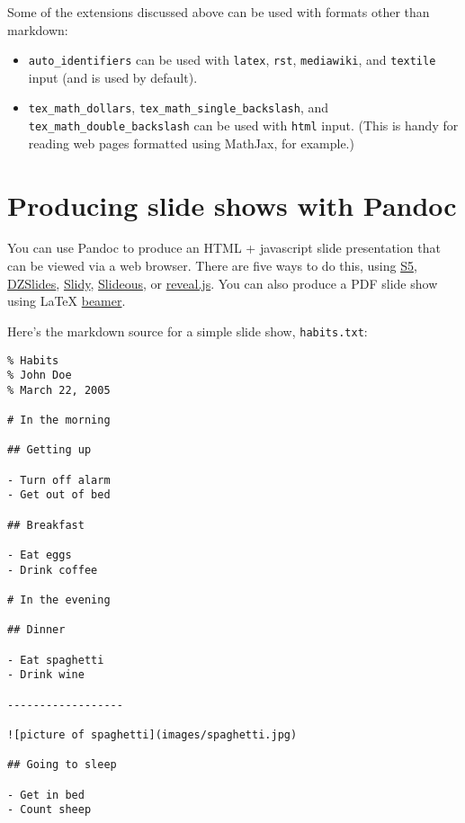 \documentclass[]{article}
\begin{document}
Some of the extensions discussed above can be used with formats other
than markdown:

\begin{itemize}
\item
  \texttt{auto\_identifiers} can be used with \texttt{latex},
  \texttt{rst}, \texttt{mediawiki}, and \texttt{textile} input (and is
  used by default).
\item
  \texttt{tex\_math\_dollars}, \texttt{tex\_math\_single\_backslash},
  and \texttt{tex\_math\_double\_backslash} can be used with
  \texttt{html} input. (This is handy for reading web pages formatted
  using MathJax, for example.)
\end{itemize}

\section{Producing slide shows with Pandoc}

You can use Pandoc to produce an HTML + javascript slide presentation
that can be viewed via a web browser. There are five ways to do this,
using \href{http://meyerweb.com/eric/tools/s5/}{S5},
\href{http://paulrouget.com/dzslides/}{DZSlides},
\href{http://www.w3.org/Talks/Tools/Slidy/}{Slidy},
\href{http://goessner.net/articles/slideous/}{Slideous}, or
\href{http://lab.hakim.se/reveal-js/}{reveal.js}. You can also produce a
PDF slide show using LaTeX
\href{http://www.tex.ac.uk/CTAN/macros/latex/contrib/beamer}{beamer}.

Here's the markdown source for a simple slide show, \texttt{habits.txt}:

\begin{verbatim}
% Habits
% John Doe
% March 22, 2005

# In the morning

## Getting up

- Turn off alarm
- Get out of bed

## Breakfast

- Eat eggs
- Drink coffee

# In the evening

## Dinner

- Eat spaghetti
- Drink wine

------------------

![picture of spaghetti](images/spaghetti.jpg)

## Going to sleep

- Get in bed
- Count sheep
\end{verbatim}
\end{document}
